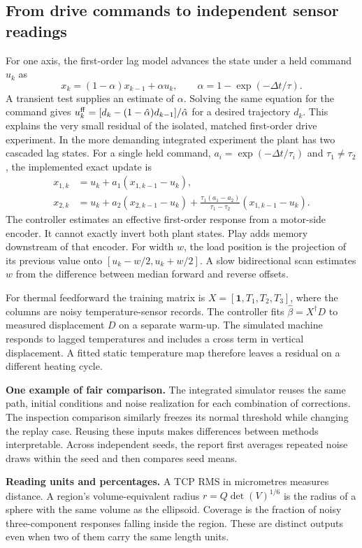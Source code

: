 \clearpage\subsection{From drive commands to independent sensor readings}
For one axis, the first-order lag model advances the state under a held command $u_k$ as
\[
 x_k=(1-\alpha)x_{k-1}+\alpha u_k,\qquad
 \alpha=1-\exp(-\Delta t/\tau).
\]
A transient test supplies an estimate of $\alpha$. Solving the same equation for the command gives $u_k^{\rm ff}=[d_k-(1-\hat\alpha)d_{k-1}]/\hat\alpha$ for a desired trajectory $d_k$. This explains the very small residual of the isolated, matched first-order drive experiment. In the more demanding integrated experiment the plant has two cascaded lag states. For a single held command, $a_i=\exp(-\Delta t/\tau_i)$ and $\tau_1\ne\tau_2$, the implemented exact update is
\begin{align*}
 x_{1,k}&=u_k+a_1(x_{1,k-1}-u_k),\\
 x_{2,k}&=u_k+a_2(x_{2,k-1}-u_k)
 +\frac{\tau_1(a_1-a_2)}{\tau_1-\tau_2}(x_{1,k-1}-u_k).
\end{align*}
The controller estimates an effective first-order response from a motor-side encoder. It cannot exactly invert both plant states. Play adds memory downstream of that encoder. For width $w$, the load position is the projection of its previous value onto $[u_k-w/2,u_k+w/2]$. A slow bidirectional scan estimates $w$ from the difference between median forward and reverse offsets.

For thermal feedforward the training matrix is $X=[\mathbf{1},T_1,T_2,T_3]$, where the columns are noisy temperature-sensor records. The controller fits $\hat\beta=X^\dagger D$ to measured displacement $D$ on a separate warm-up. The simulated machine responds to lagged temperatures and includes a cross term in vertical displacement. A fitted static temperature map therefore leaves a residual on a different heating cycle.

\textbf{One example of fair comparison.} The integrated simulator reuses the same path, initial conditions and noise realization for each combination of corrections. The inspection comparison similarly freezes its normal threshold while changing the replay case. Reusing these inputs makes differences between methods interpretable. Across independent seeds, the report first averages repeated noise draws within the seed and then compares seed means.

\textbf{Reading units and percentages.} A TCP RMS in micrometres measures distance. A region's volume-equivalent radius $r=Q\det(V)^{1/6}$ is the radius of a sphere with the same volume as the ellipsoid. Coverage is the fraction of noisy three-component responses falling inside the region. These are distinct outputs even when two of them carry the same length units.

